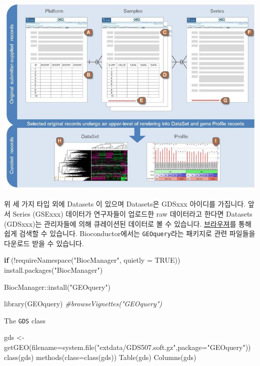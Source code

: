 \documentclass[
]{book}
\newenvironment{Shaded}{\begin{snugshade}}{\end{snugshade}}
\newcommand{\AttributeTok}[1]{\textcolor[rgb]{0.77,0.63,0.00}{#1}}
\newcommand{\CommentTok}[1]{\textcolor[rgb]{0.56,0.35,0.01}{\textit{#1}}}
\newcommand{\ConstantTok}[1]{\textcolor[rgb]{0.00,0.00,0.00}{#1}}
\newcommand{\ControlFlowTok}[1]{\textcolor[rgb]{0.13,0.29,0.53}{\textbf{#1}}}
\newcommand{\FunctionTok}[1]{\textcolor[rgb]{0.00,0.00,0.00}{#1}}
\newcommand{\NormalTok}[1]{#1}
\newcommand{\OtherTok}[1]{\textcolor[rgb]{0.56,0.35,0.01}{#1}}
\newcommand{\SpecialCharTok}[1]{\textcolor[rgb]{0.00,0.00,0.00}{#1}}
\newcommand{\StringTok}[1]{\textcolor[rgb]{0.31,0.60,0.02}{#1}}
\begin{document}
\includegraphics[width=6.25in,height=\textheight]{images/04/geo_overview.jpg}

위 세 가지 타입 외에 Datasets 이 있으며 Datasets은 GDSxxx 아이디를 가집니다. 앞서 Series (GSExxx) 데이터가 연구자들이 업로드한 raw 데이터라고 한다면 Datasets (GDSxxx)는 관리자들에 의해 큐레이션된 데이터로 볼 수 있습니다. \href{https://www.ncbi.nlm.nih.gov/geo/summary/}{브라우져}를 통해 쉽게 검색할 수 있습니다. Bioconductor에서는 \texttt{GEOquery}라는 패키지로 관련 파일들을 다운로드 받을 수 있습니다.

\begin{Shaded}
\begin{Highlighting}[]
\ControlFlowTok{if}\NormalTok{ (}\SpecialCharTok{!}\FunctionTok{requireNamespace}\NormalTok{(}\StringTok{"BiocManager"}\NormalTok{, }\AttributeTok{quietly =} \ConstantTok{TRUE}\NormalTok{))}
    \FunctionTok{install.packages}\NormalTok{(}\StringTok{"BiocManager"}\NormalTok{)}

\NormalTok{BiocManager}\SpecialCharTok{::}\FunctionTok{install}\NormalTok{(}\StringTok{"GEOquery"}\NormalTok{)}

\FunctionTok{library}\NormalTok{(GEOquery)}
\CommentTok{\#browseVignettes("GEOquery")}
\end{Highlighting}
\end{Shaded}

The \texttt{GDS} class

\begin{Shaded}
\begin{Highlighting}[]
\NormalTok{gds }\OtherTok{\textless{}{-}} \FunctionTok{getGEO}\NormalTok{(}\AttributeTok{filename=}\FunctionTok{system.file}\NormalTok{(}\StringTok{"extdata/GDS507.soft.gz"}\NormalTok{,}\AttributeTok{package=}\StringTok{"GEOquery"}\NormalTok{))}
\FunctionTok{class}\NormalTok{(gds)}
\FunctionTok{methods}\NormalTok{(}\AttributeTok{class=}\FunctionTok{class}\NormalTok{(gds))}
\FunctionTok{Table}\NormalTok{(gds)}
\FunctionTok{Columns}\NormalTok{(gds)}
\end{Highlighting}
\end{Shaded}
\end{document}
